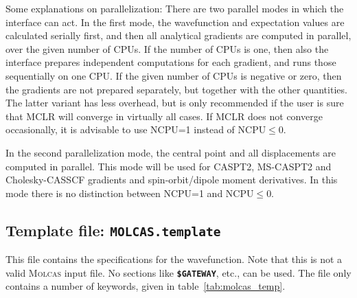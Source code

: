 \documentclass[a4paper,11pt,DIV=15,openany,twoside=false]{scrbook}
\newcommand{\ttt}[1]{\textbf{\texttt{#1}}}
\begin{document}
Some explanations on parallelization: There are two parallel modes in which the interface can act. In the first mode, the wavefunction and expectation values are calculated serially first, and then all analytical gradients are computed in parallel, over the given number of CPUs. If the number of CPUs is one, then also the interface prepares independent computations for each gradient, and runs those sequentially on one CPU. If the given number of CPUs is negative or zero, then the gradients are not prepared separately, but together with the other quantities. The latter variant has less overhead, but is only recommended if the user is sure that MCLR will converge in virtually all cases. If MCLR does not converge occasionally, it is advisable to use NCPU=1 instead of NCPU$\leq$0.

In the second parallelization mode, the central point and all displacements are computed in parallel. This mode will be used for CASPT2, MS-CASPT2 and Cholesky-CASSCF gradients and spin-orbit/dipole moment derivatives. In this mode there is no distinction between NCPU=1 and NCPU$\leq$0.

\subsection{Template file: \ttt{MOLCAS.template}}

This file contains the specifications for the wavefunction. Note that this is not a valid \textsc{Molcas} input file. No sections like \ttt{\$GATEWAY}, etc., can be used. The file only contains a number of keywords, given in table~\ref{tab:molcas_temp}.
\end{document}
